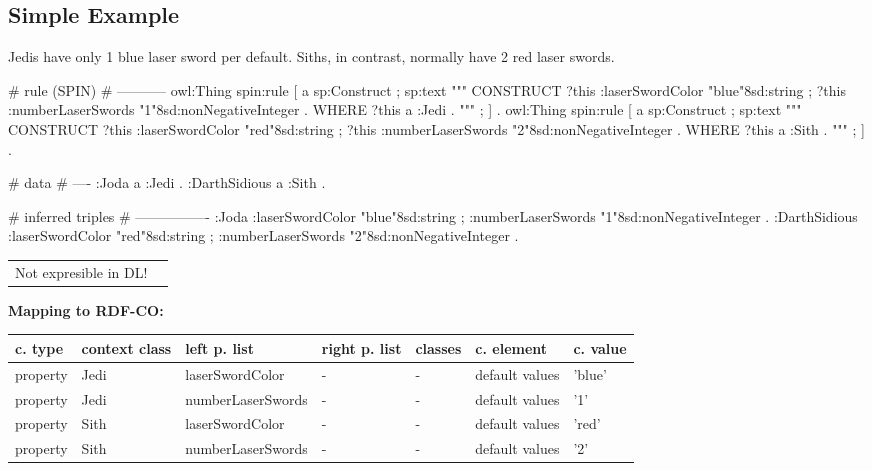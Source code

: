 \documentclass{llncs}
\newenvironment{gcotable}{
  \scriptsize
  \sffamily
  \vspace{0cm}
	\begin{center}
	\textbf{\vspace{0.4cm}Mapping to RDF-CO:} \\
  \begin{tabular}{l|l|l|l|l|l|l}
	\hline
  \textbf{c. type} & \textbf{context class} & \textbf{left p. list} & \textbf{right p. list} & \textbf{classes} & \textbf{c. element} & \textbf{c. value} \\
  \hline

}{
  \hline
  \end{tabular}
	\end{center}
}
\newenvironment{DL}{
  \vspace{0cm}
	\begin{center}
  \begin{tabular}{r l}

}{
  \end{tabular}
	\end{center}
}
\begin{document}
\subsection{Simple Example}

Jedis have only 1 blue laser sword per default.
Siths, in contrast, normally have 2 red laser swords.

\begin{ex}
# rule (SPIN)
# -----------
owl:Thing
    spin:rule [
        a sp:Construct ;
            sp:text """
                CONSTRUCT {            
                    ?this :laserSwordColor "blue"^^xsd:string ;
                    ?this :numberLaserSwords "1"^^xsd:nonNegativeInteger . 
                }
                WHERE {             
                    ?this a :Jedi .            
                } """ ; ] .
owl:Thing
    spin:rule [
        a sp:Construct ;
            sp:text """
                CONSTRUCT {
                    ?this :laserSwordColor "red"^^xsd:string ;
                    ?this :numberLaserSwords "2"^^xsd:nonNegativeInteger . 
                }
                WHERE {             
                    ?this a :Sith .            
                } """ ; ] .
\end{ex}

\begin{ex}
# data
# ----
:Joda a :Jedi .
:DarthSidious a :Sith .
\end{ex}

\begin{ex}
# inferred triples
# ----------------
:Joda 
    :laserSwordColor "blue"^^xsd:string ;
    :numberLaserSwords "1"^^xsd:nonNegativeInteger .
:DarthSidious 
    :laserSwordColor "red"^^xsd:string ;
    :numberLaserSwords "2"^^xsd:nonNegativeInteger .
\end{ex}

\begin{DL}
Not expresible in DL!
\end{DL}

\begin{gcotable}
property & Jedi & laserSwordColor & - & - & default values & 'blue' \\
property & Jedi & numberLaserSwords & - & - & default values & '1' \\
property & Sith & laserSwordColor & - & - & default values & 'red' \\
property & Sith & numberLaserSwords & - & - & default values & '2' \\
\end{gcotable}
\end{document}
